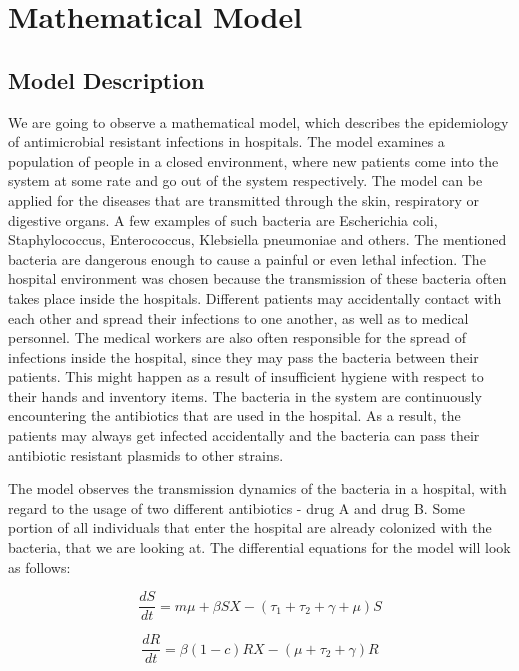 \chapter{Mathematical Model}


\section{Model Description}

We are going to observe a mathematical model, which describes the epidemiology of antimicrobial resistant infections in hospitals. The model examines a population of people in a closed environment, where new patients come into the system at some rate and go out of the system respectively. The model can be applied for the diseases that are transmitted through the skin, respiratory or digestive organs. A few examples of such bacteria are Escherichia coli, Staphylococcus, Enterococcus, Klebsiella pneumoniae and others. The mentioned bacteria are dangerous enough to cause a painful or even lethal infection. The hospital environment was chosen because the transmission of these bacteria often takes place inside the hospitals. Different patients may accidentally contact with each other and spread their infections to one another, as well as to medical personnel. The medical workers are also often responsible for the spread of infections inside the hospital, since they may pass the bacteria between their patients. This might happen as a result of insufficient hygiene with respect to their hands and inventory items. The bacteria in the system are continuously encountering the antibiotics that are used in the hospital. As a result, the patients may always get infected accidentally and the bacteria can pass their antibiotic resistant plasmids to other strains.

The model observes the transmission dynamics of the bacteria in a hospital, with regard to the usage of two different antibiotics - drug A and drug B. Some portion of all individuals that enter the hospital are already colonized with the bacteria, that we are looking at. The differential equations for the model will look as follows:

\begin{equation}
\frac{dS}{dt} = m \mu + \beta S X - (\tau_1 + \tau_2 + \gamma + \mu) S
\end{equation}

\begin{equation}
\frac{dR}{dt} = \beta (1 - c) R X - (\mu + \tau_2 + \gamma) R
\end{equation}


